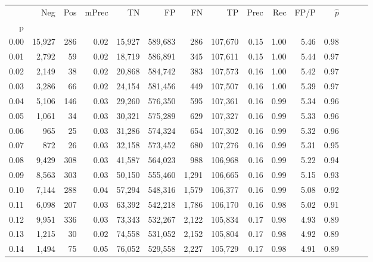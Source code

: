 \begin{tabular}{rrrrrrrrrrrrrrr}
\toprule
{} &     Neg &    Pos & mPrec &       TN &       FP &       FN &       TP &  Prec &   Rec &  FP/P & $\hat{p}$ \\
p    &         &        &       &          &          &          &          &       &       &       &           \\
\midrule
0.00 &  15,927 &    286 &  0.02 &   15,927 &  589,683 &      286 &  107,670 &  0.15 &  1.00 &  5.46 &      0.98 \\
0.01 &   2,792 &     59 &  0.02 &   18,719 &  586,891 &      345 &  107,611 &  0.15 &  1.00 &  5.44 &      0.97 \\
0.02 &   2,149 &     38 &  0.02 &   20,868 &  584,742 &      383 &  107,573 &  0.16 &  1.00 &  5.42 &      0.97 \\
0.03 &   3,286 &     66 &  0.02 &   24,154 &  581,456 &      449 &  107,507 &  0.16 &  1.00 &  5.39 &      0.97 \\
0.04 &   5,106 &    146 &  0.03 &   29,260 &  576,350 &      595 &  107,361 &  0.16 &  0.99 &  5.34 &      0.96 \\
0.05 &   1,061 &     34 &  0.03 &   30,321 &  575,289 &      629 &  107,327 &  0.16 &  0.99 &  5.33 &      0.96 \\
0.06 &     965 &     25 &  0.03 &   31,286 &  574,324 &      654 &  107,302 &  0.16 &  0.99 &  5.32 &      0.96 \\
0.07 &     872 &     26 &  0.03 &   32,158 &  573,452 &      680 &  107,276 &  0.16 &  0.99 &  5.31 &      0.95 \\
0.08 &   9,429 &    308 &  0.03 &   41,587 &  564,023 &      988 &  106,968 &  0.16 &  0.99 &  5.22 &      0.94 \\
0.09 &   8,563 &    303 &  0.03 &   50,150 &  555,460 &    1,291 &  106,665 &  0.16 &  0.99 &  5.15 &      0.93 \\
0.10 &   7,144 &    288 &  0.04 &   57,294 &  548,316 &    1,579 &  106,377 &  0.16 &  0.99 &  5.08 &      0.92 \\
0.11 &   6,098 &    207 &  0.03 &   63,392 &  542,218 &    1,786 &  106,170 &  0.16 &  0.98 &  5.02 &      0.91 \\
0.12 &   9,951 &    336 &  0.03 &   73,343 &  532,267 &    2,122 &  105,834 &  0.17 &  0.98 &  4.93 &      0.89 \\
0.13 &   1,215 &     30 &  0.02 &   74,558 &  531,052 &    2,152 &  105,804 &  0.17 &  0.98 &  4.92 &      0.89 \\
0.14 &   1,494 &     75 &  0.05 &   76,052 &  529,558 &    2,227 &  105,729 &  0.17 &  0.98 &  4.91 &      0.89 \\

\end{tabular}

